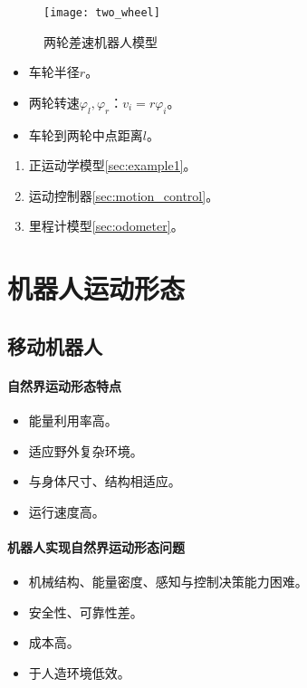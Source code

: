 \documentclass[
12pt, %
a4paper, 
oneside, %
headinclude,footinclude, %
]{scrartcl}
\begin{document}
\noindent
\begin{minipage}{0.3\textwidth}
\begin{figure}[H]
\centering
\texttt{[image: two\_wheel]} 
\caption{两轮差速机器人模型}
\end{figure}
\end{minipage}
\begin{minipage}{0.4\textwidth}
\begin{itemize}
\item 车轮半径$ r $。
\item 两轮转速$ \varphi_l,\varphi_r $：$ v_i = r\varphi_i $。
\item 车轮到两轮中点距离$ l $。
\end{itemize}
\end{minipage}
\begin{minipage}{0.3\textwidth}
\begin{enumerate}
\item 正运动学模型\ref{sec:example1}。
\item 运动控制器\ref{sec:motion_control}。
\item 里程计模型\ref{sec:odometer}。
\end{enumerate}
\end{minipage}
\section{机器人运动形态}
\subsection[移动机器人]{移动机器人}
\noindent
\begin{minipage}{0.4\textwidth}
\paragraph{自然界运动形态特点}
\begin{itemize}
\item 能量利用率高。
\item 适应野外复杂环境。
\item 与身体尺寸、结构相适应。
\item 运行速度高。
\end{itemize}
\end{minipage}
\begin{minipage}{0.6\textwidth}
\paragraph{机器人实现自然界运动形态问题}
\begin{itemize}
\item 机械结构、能量密度、感知与控制决策能力困难。
\item 安全性、可靠性差。
\item 成本高。
\item 于人造环境低效。
\end{itemize}
\end{minipage}
\end{document}
